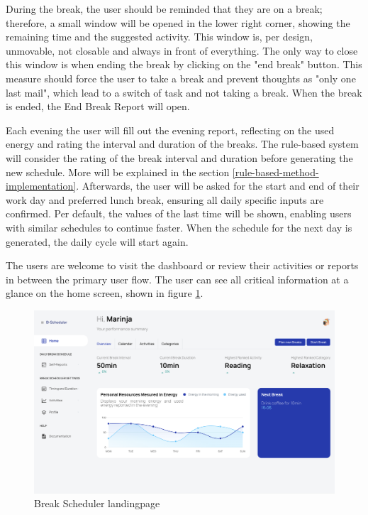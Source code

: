 \documentclass{hasel_thesis}
\begin{document}
During the break, the user should be reminded that they are on a break; therefore, a small window will be opened in the lower right corner, showing the remaining time and the suggested activity. This window is, per design, unmovable, not closable and always in front of everything. The only way to close this window is when ending the break by clicking on the "end break" button. This measure should force the user to take a break and prevent thoughts as "only one last mail", which lead to a switch of task and not taking a break. When the break is ended, the End Break Report will open.

Each evening the user will fill out the evening report, reflecting on the used energy and rating the interval and duration of the breaks. The rule-based system will consider the rating of the break interval and duration before generating the new schedule. More will be explained in the section \ref{rule-based-method-implementation}. Afterwards, the user will be asked for the start and end of their work day and preferred lunch break, ensuring all daily specific inputs are confirmed. Per default, the values of the last time will be shown, enabling users with similar schedules to continue faster. When the schedule for the next day is generated, the daily cycle will start again.

The users are welcome to visit the dashboard or review their activities or reports in between the primary user flow. The user can see all critical information at a glance on the home screen, shown in figure \ref{fig:dashboard}.

\begin{figure}[htp]
    \centering
    \includegraphics[width=15cm]{hasel_thesis/images/dashboard.png}
    \caption{Break Scheduler landingpage}
    \label{fig:dashboard}
\end{figure}
\end{document}
